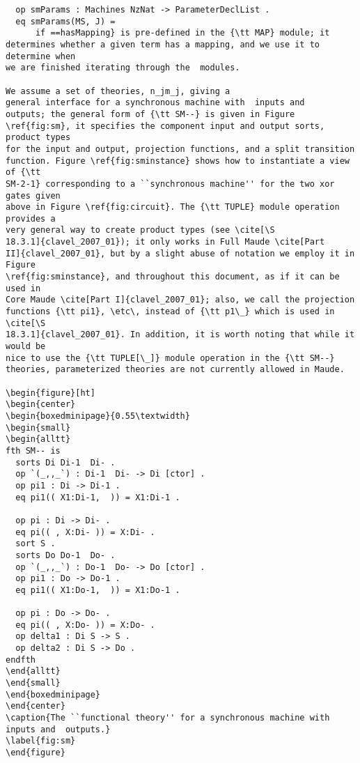 \documentclass[copyright,creativecommons]{eptcs}
\newcommand{\etc}{\textit{etc.}}
\begin{document}
\begin{center}
\begin{small}
\begin{boxedminipage}{0.75\textwidth}
\begin{verbatim}
  op smParams : Machines NzNat -> ParameterDeclList .
  eq smParams(MS, J) = 
      if ==hasMapping} is pre-defined in the {\tt MAP} module; it
determines whether a given term has a mapping, and we use it to determine when
we are finished iterating through the  modules.

We assume a set of theories, n_jm_j, giving a
general interface for a synchronous machine with  inputs and 
outputs; the general form of {\tt SM--} is given in Figure
\ref{fig:sm}, it specifies the component input and output sorts, product types
for the input and output, projection functions, and a split transition
function. Figure \ref{fig:sminstance} shows how to instantiate a view of {\tt
SM-2-1} corresponding to a ``synchronous machine'' for the two xor gates given
above in Figure \ref{fig:circuit}. The {\tt TUPLE} module operation provides a
very general way to create product types (see \cite[\S
18.3.1]{clavel_2007_01}); it only works in Full Maude \cite[Part
II]{clavel_2007_01}, but by a slight abuse of notation we employ it in Figure
\ref{fig:sminstance}, and throughout this document, as if it can be used in
Core Maude \cite[Part I]{clavel_2007_01}; also, we call the projection
functions {\tt pi1}, \etc\, instead of {\tt p1\_} which is used in \cite[\S
18.3.1]{clavel_2007_01}. In addition, it is worth noting that while it would be
nice to use the {\tt TUPLE[\_]} module operation in the {\tt SM--}
theories, parameterized theories are not currently allowed in Maude.

\begin{figure}[ht]
\begin{center}
\begin{boxedminipage}{0.55\textwidth}
\begin{small}
\begin{alltt}
fth SM-- is
  sorts Di Di-1  Di- .
  op `(_,,_`) : Di-1  Di- -> Di [ctor] .
  op pi1 : Di -> Di-1 .
  eq pi1(( X1:Di-1,  )) = X1:Di-1 .
  
  op pi : Di -> Di- .
  eq pi(( , X:Di- )) = X:Di- .
  sort S .
  sorts Do Do-1  Do- .
  op `(_,,_`) : Do-1  Do- -> Do [ctor] .
  op pi1 : Do -> Do-1 .
  eq pi1(( X1:Do-1,  )) = X1:Do-1 .
  
  op pi : Do -> Do- .
  eq pi(( , X:Do- )) = X:Do- .
  op delta1 : Di S -> S .
  op delta2 : Di S -> Do .
endfth
\end{alltt}
\end{small}
\end{boxedminipage}
\end{center}
\caption{The ``functional theory'' for a synchronous machine with  inputs and  outputs.}
\label{fig:sm}
\end{figure}
 

\end{verbatim}
\end{boxedminipage}
\end{small}
\end{center}
\end{document}
